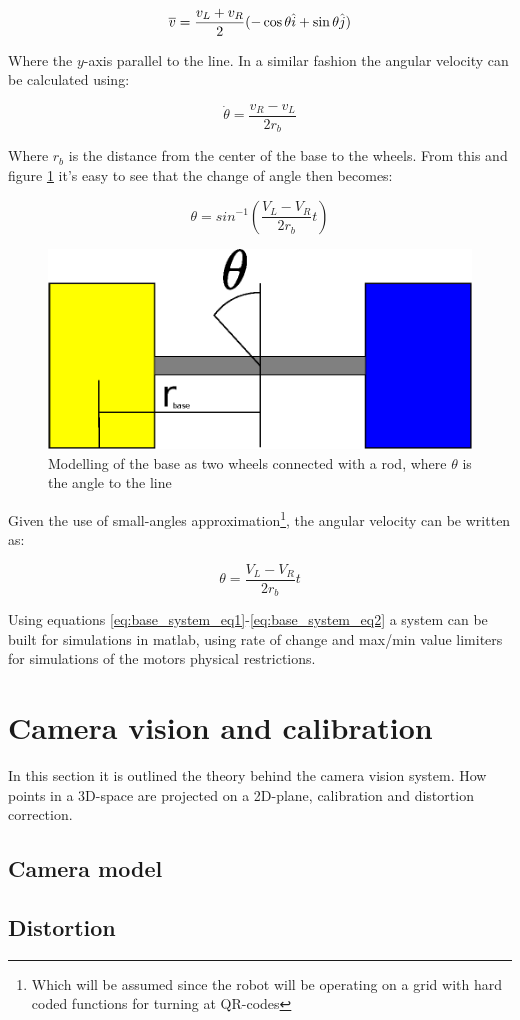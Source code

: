 \begin{equation}
    \overline{v}= \frac{v_L+v_R}{2}(-\cos \theta \hat{i}+ \sin \theta \Hat{j})
\end{equation}

\noindent Where the $y$-axis parallel to the line. In a similar fashion the angular velocity can be calculated using:

\begin{equation}
    \Dot{\theta} = \frac{v_R-v_L}{2r_{b}}
    \label{eq:base_system_eq2}
\end{equation}

\noindent Where $r_{b}$ is the distance from the center of the base to the wheels. From this and figure \ref{fig:base_math_model} it's easy to see that the change of angle then becomes:

\begin{equation}
    \theta = sin^{-1}\left(\frac{V_L-V_R}{2r_{b}}t\right)
\end{equation}

\begin{figure}[H]
    \centering
    \includegraphics[width=0.7\columnwidth]{chapters/img/base_math_model.eps}
    \caption{Modelling of the base as two wheels connected with a rod, where $\theta$ is the angle to the line}
    \label{fig:base_math_model}
\end{figure}

Given the use of small-angles approximation\footnote{Which will be assumed since the robot will be operating on a grid with hard coded functions for turning at QR-codes}, the angular velocity can be written as:

\begin{equation}
    \theta = \frac{V_L-V_R}{2r_{b}}t
\end{equation}


\noindent Using equations \eqref{eq:base_system_eq1}-\eqref{eq:base_system_eq2} a system can be built for simulations in matlab, using rate of change and max/min value limiters for simulations of the motors physical restrictions.



\section*{Camera vision and calibration}
In this section it is outlined the theory behind the camera vision system. 
How points in a 3D-space are projected on a 2D-plane, calibration and distortion correction. 
\subsection*{Camera model}
\subsection*{Distortion}

